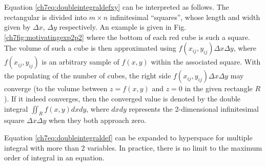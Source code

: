 Equation \eqref{ch7eq:doubleintegraldefxy} can be interpreted as follows. The rectangular is divided into $m\times n$ infinitesimal ``squares'', whose length and width given by $\Delta x$, $\Delta y$ respectively. An example is given in Fig. \ref{ch7fig:motivatingexp2p2} where the bottom of each red cube is such a square. The volume of such a cube is then approximated using $f(x_{ij},y_{ij})\Delta x \Delta y$, where $f(x_{ij},y_{ij})$ is an arbitrary sample of $f(x,y)$ within the associated square. With the populating of the number of cubes, the right side $f(x_{ij},y_{ij})\Delta x \Delta y$ may converge (to the volume between $z=f(x,y)$ and $z=0$ in the given rectangle $R$). If it indeed converges, then the converged value is denoted by the double integral $\iint_{R} f(x,y)dxdy$, where $dxdy$ represents the 2-dimensional infinitesimal square $\Delta x \Delta y$ when they both approach zero.

Equation \eqref{ch7eq:doubleintegraldef} can be expanded to hyperspace for multiple integral with more than 2 variables. In practice, there is no limit to the maximum order of integral in an equation.